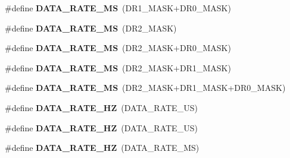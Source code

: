 \begin{DoxyCompactItemize}
\item 
\hypertarget{group___engduino_accelerometer_ga0f634478d3ead5c596df18812bd1da1b}{}\#define {\bfseries D\+A\+T\+A\+\_\+\+R\+A\+T\+E\+\_\+M\+S}~(D\+R1\+\_\+\+M\+A\+S\+K+D\+R0\+\_\+\+M\+A\+S\+K)\label{group___engduino_accelerometer_ga0f634478d3ead5c596df18812bd1da1b}

\item 
\hypertarget{group___engduino_accelerometer_gaad347452fcd1fbc92df44c7afd136afd}{}\#define {\bfseries D\+A\+T\+A\+\_\+\+R\+A\+T\+E\+\_\+M\+S}~(D\+R2\+\_\+\+M\+A\+S\+K)\label{group___engduino_accelerometer_gaad347452fcd1fbc92df44c7afd136afd}

\item 
\hypertarget{group___engduino_accelerometer_ga49380e86dd5d7840db7c9c436399d6a0}{}\#define {\bfseries D\+A\+T\+A\+\_\+\+R\+A\+T\+E\+\_\+M\+S}~(D\+R2\+\_\+\+M\+A\+S\+K+D\+R0\+\_\+\+M\+A\+S\+K)\label{group___engduino_accelerometer_ga49380e86dd5d7840db7c9c436399d6a0}

\item 
\hypertarget{group___engduino_accelerometer_gade38279800638b747c6941678a82e19c}{}\#define {\bfseries D\+A\+T\+A\+\_\+\+R\+A\+T\+E\+\_\+M\+S}~(D\+R2\+\_\+\+M\+A\+S\+K+D\+R1\+\_\+\+M\+A\+S\+K)\label{group___engduino_accelerometer_gade38279800638b747c6941678a82e19c}

\item 
\hypertarget{group___engduino_accelerometer_gaf12881c570c62a9141fdfd49589915f8}{}\#define {\bfseries D\+A\+T\+A\+\_\+\+R\+A\+T\+E\+\_\+M\+S}~(D\+R2\+\_\+\+M\+A\+S\+K+D\+R1\+\_\+\+M\+A\+S\+K+D\+R0\+\_\+\+M\+A\+S\+K)\label{group___engduino_accelerometer_gaf12881c570c62a9141fdfd49589915f8}

\item 
\hypertarget{group___engduino_accelerometer_ga475bdad14fabf35587acd83c4fc6d3f8}{}\#define {\bfseries D\+A\+T\+A\+\_\+\+R\+A\+T\+E\+\_\+H\+Z}~(D\+A\+T\+A\+\_\+\+R\+A\+T\+E\+\_\+U\+S)\label{group___engduino_accelerometer_ga475bdad14fabf35587acd83c4fc6d3f8}

\item 
\hypertarget{group___engduino_accelerometer_gad133fcc36777ffd08769ac487d35c7c2}{}\#define {\bfseries D\+A\+T\+A\+\_\+\+R\+A\+T\+E\+\_\+H\+Z}~(D\+A\+T\+A\+\_\+\+R\+A\+T\+E\+\_\+U\+S)\label{group___engduino_accelerometer_gad133fcc36777ffd08769ac487d35c7c2}

\item 
\hypertarget{group___engduino_accelerometer_ga62f058d0b7298dbf3d16087a6ac3a73e}{}\#define {\bfseries D\+A\+T\+A\+\_\+\+R\+A\+T\+E\+\_\+H\+Z}~(D\+A\+T\+A\+\_\+\+R\+A\+T\+E\+\_\+M\+S)\label{group___engduino_accelerometer_ga62f058d0b7298dbf3d16087a6ac3a73e}


\end{DoxyCompactItemize}
